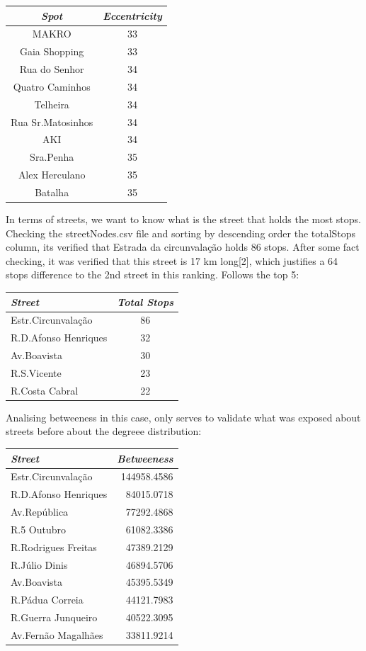 \documentclass[12pt]{article}
\begin{document}
\begin{multicols}{2}
\begin{center}
\begin{tabular}[h]{|c|c|}
\hline
\em{Spot} & \em{Eccentricity}\\
\hline
MAKRO &	33\\
Gaia Shopping & 33\\
Rua do Senhor & 34\\
Quatro Caminhos	& 34\\
Telheira & 34\\
Rua Sr.Matosinhos & 34\\
AKI & 34\\
Sra.Penha & 35\\
Alex Herculano & 35\\
Batalha & 35\\
\hline
\end{tabular}
\end{center}


In terms of streets, we want to know what is the street that holds the most stops. Checking the streetNodes.csv file and sorting by descending order the totalStops column, its verified that Estrada da circunvalação holds 86 stops. After some fact checking, it was verified that this street is 17 km long[2], which justifies a 64 stops difference to the 2nd street in this ranking. Follows the top 5:
\begin{center}
\begin{tabular}[h]{|l|c|}
\hline
\em{Street} & \em{Total Stops}\\
\hline
Estr.Circunvalação & 86\\
R.D.Afonso Henriques & 32\\
Av.Boavista	& 30\\
R.S.Vicente& 23\\
R.Costa Cabral & 22\\
\hline
\end{tabular}
\end{center} 

Analising betweeness in this case, only serves to validate what was exposed about streets before about the degreee distribution:\\
\begin{center}
\begin{tabular}[h]{|l|r|}
\hline
\em{Street} & \em{Betweeness}\\
\hline
Estr.Circunvalação	& 144958.4586 \\
R.D.Afonso Henriques &	84015.0718\\
Av.República &	77292.4868\\
R.5 Outubro	& 61082.3386\\
R.Rodrigues Freitas &	47389.2129\\
R.Júlio Dinis	& 46894.5706\\
Av.Boavista &	45395.5349\\
R.Pádua Correia &	44121.7983\\
R.Guerra Junqueiro &	40522.3095\\
Av.Fernão Magalhães &	33811.9214\\


\end{tabular}
\end{center}
\end{multicols}
\end{document}
